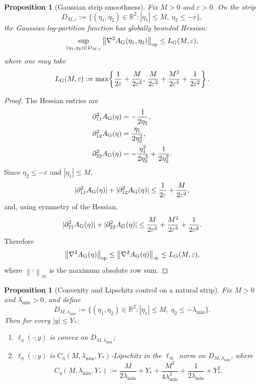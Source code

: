 \documentclass[11pt]{article}
\newtheorem{proposition}[theorem]{Proposition}
\theoremstyle{definition}
\newcommand{\R}{\mathbb{R}}
\newcommand{\norm}[1]{\left\lVert #1 \right\rVert}
\begin{document}
\begin{proposition}[Gaussian strip smoothness]
\label{prop:gaussian-smoothness-k1}
Fix $M>0$ and $\varepsilon>0$. On the strip
\[
  D_{M,\varepsilon}
  :=
  \{(\eta_1,\eta_2)\in\R^2: |\eta_1|\le M,\ \eta_2\le -\varepsilon\},
\]
the Gaussian log-partition function has globally bounded Hessian:
\[
  \sup_{(\eta_1,\eta_2)\in D_{M,\varepsilon}}
  \norm{\nabla^2 A_{\rm G}(\eta_1,\eta_2)}_{\mathrm{op}}
  \le
  L_{\rm G}(M,\varepsilon),
\]
where one may take
\[
  L_{\rm G}(M,\varepsilon)
  :=
  \max\!\left\{
    \frac{1}{2\varepsilon}
    +
    \frac{M}{2\varepsilon^2},
    \,
    \frac{M}{2\varepsilon^2}
    +
    \frac{M^2}{2\varepsilon^3}
    +
    \frac{1}{2\varepsilon^2}
  \right\}.
\]
\end{proposition}

\begin{proof}
The Hessian entries are
\begin{align*}
  \partial_{11}^2 A_{\rm G}(\eta)
  &=
  -\frac{1}{2\eta_2},
  \\
  \partial_{12}^2 A_{\rm G}(\eta)
  &=
  \frac{\eta_1}{2\eta_2^2},
  \\
  \partial_{22}^2 A_{\rm G}(\eta)
  &=
  -\frac{\eta_1^2}{2\eta_2^3}+\frac{1}{2\eta_2^2}.
\end{align*}
Since $\eta_2\le -\varepsilon$ and $|\eta_1|\le M$,
\[
  |\partial_{11}^2 A_{\rm G}(\eta)|+|\partial_{12}^2 A_{\rm G}(\eta)|
  \le
  \frac{1}{2\varepsilon}+\frac{M}{2\varepsilon^2},
\]
and, using symmetry of the Hessian,
\[
  |\partial_{21}^2 A_{\rm G}(\eta)|+|\partial_{22}^2 A_{\rm G}(\eta)|
  \le
  \frac{M}{2\varepsilon^2}
  +
  \frac{M^2}{2\varepsilon^3}
  +
  \frac{1}{2\varepsilon^2}.
\]
Therefore
\[
  \norm{\nabla^2 A_{\rm G}(\eta)}_{\mathrm{op}}
  \le
  \norm{\nabla^2 A_{\rm G}(\eta)}_{\infty}
  \le
  L_{\rm G}(M,\varepsilon),
\]
where $\norm{\cdot}_{\infty}$ is the maximum absolute row sum.
\end{proof}

\begin{proposition}[Convexity and Lipschitz control on a natural strip]
\label{prop:convex-lipschitz-strip-k1}
Fix $M>0$ and $\lambda_{\min}>0$, and define
\[
  D_{M,\lambda_{\min}}
  :=
  \{(\eta_1,\eta_2)\in\R^2: |\eta_1|\le M,\ \eta_2\le -\lambda_{\min}\}.
\]
Then for every $|y|\le Y_\ast$:
\begin{enumerate}[label=(\roman*)]
  \item $\ell_\eta(\cdot;y)$ is convex on $D_{M,\lambda_{\min}}$;
  \item $\ell_\eta(\cdot;y)$ is
  $C_\eta(M,\lambda_{\min},Y_\ast)$-Lipschitz in the $\ell_\infty$ norm on
  $D_{M,\lambda_{\min}}$, where
  \begin{equation}
    C_\eta(M,\lambda_{\min},Y_\ast)
    :=
    \frac{M}{2\lambda_{\min}} + Y_\ast
    + \frac{M^2}{4\lambda_{\min}^2}
    + \frac{1}{2\lambda_{\min}}
    + Y_\ast^2.
    \label{eq:Ceta-k1}
  \end{equation}
\end{enumerate}
\end{proposition}
\end{document}
